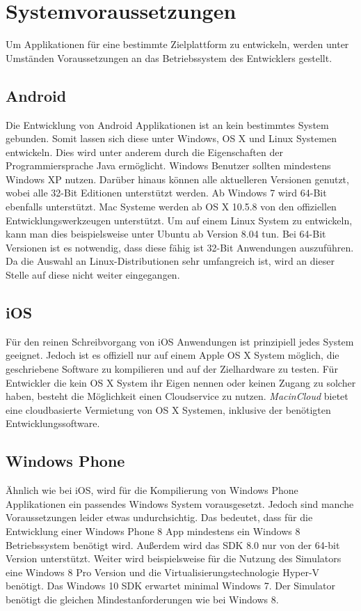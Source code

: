 \section{Systemvoraussetzungen}
Um Applikationen für eine bestimmte Zielplattform zu entwickeln, werden unter Umständen Voraussetzungen an das Betriebssystem des Entwicklers gestellt.

\subsection{Android}
Die Entwicklung von Android Applikationen ist an kein bestimmtes System gebunden. Somit lassen sich diese unter Windows, OS X und Linux Systemen entwickeln. Dies wird unter anderem durch die Eigenschaften der Programmiersprache Java ermöglicht.
Windows Benutzer sollten mindestens Windows XP nutzen. Darüber hinaus können alle aktuelleren Versionen genutzt, wobei alle 32-Bit Editionen unterstützt werden. Ab Windows 7 wird 64-Bit ebenfalls unterstützt.
Mac Systeme werden ab OS X 10.5.8 von den offiziellen Entwicklungswerkzeugen unterstützt.
Um auf einem Linux System zu entwickeln, kann man dies beispielsweise unter Ubuntu ab Version 8.04 tun. Bei 64-Bit Versionen ist es notwendig, dass diese fähig ist 32-Bit Anwendungen auszuführen. Da die Auswahl an Linux-Distributionen sehr umfangreich ist, wird an dieser Stelle auf diese nicht weiter eingegangen.
\citep{android_sdk_requirements}

\subsection{iOS}
Für den reinen Schreibvorgang von iOS Anwendungen ist prinzipiell jedes System geeignet. Jedoch ist es offiziell nur auf einem Apple OS X System möglich, die geschriebene Software zu kompilieren und auf der Zielhardware zu testen. Für Entwickler die kein OS X System ihr Eigen nennen oder keinen Zugang zu solcher haben, besteht die Möglichkeit einen Cloudservice zu nutzen. \textit{MacinCloud} bietet eine cloudbasierte Vermietung von OS X Systemen, inklusive der benötigten Entwicklungssoftware. \citep{macincloud}

\subsection{Windows Phone}
Ähnlich wie bei iOS, wird für die Kompilierung von Windows Phone Applikationen ein passendes Windows System vorausgesetzt. Jedoch sind manche Voraussetzungen leider etwas undurchsichtig. Das bedeutet, dass für die Entwicklung einer Windows Phone 8 App mindestens ein Windows 8 Betriebssystem benötigt wird. Außerdem wird das SDK 8.0 nur von der 64-bit Version unterstützt. Weiter wird beispielsweise für die Nutzung des Simulators eine Windows 8 Pro Version und die Virtualisierungstechnologie Hyper-V benötigt. Das Windows 10 SDK erwartet minimal Windows 7. Der Simulator benötigt die gleichen Mindestanforderungen wie bei Windows 8. \citep{WP8_requirements, WP10_SDK, WP10_Emulator} 

